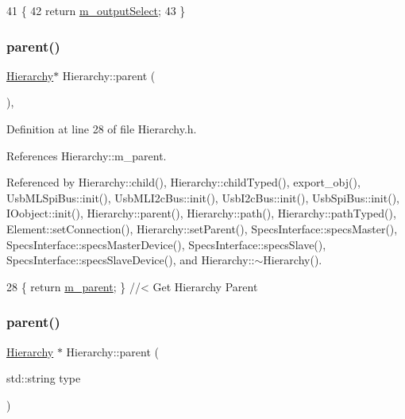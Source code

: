 \begin{DoxyCode}
41                                            \{
42     \textcolor{keywordflow}{return} \hyperlink{classSpecsInterface_a660cb4112ce1c071f277cb6ec115b411}{m\_outputSelect};
43 \}
\end{DoxyCode}
\mbox{\label{classHierarchy_a1c7bec8257e717f9c1465e06ebf845fc}} 
\subsubsection{\texorpdfstring{parent()}{parent()}\hspace{0.1cm}{\footnotesize\ttfamily [1/2]}}
{\footnotesize\ttfamily \hyperlink{classHierarchy}{Hierarchy}$\ast$ Hierarchy\+::parent (\begin{DoxyParamCaption}{ }\end{DoxyParamCaption})\hspace{0.3cm}{\ttfamily [inline]}, {\ttfamily [inherited]}}



Definition at line 28 of file Hierarchy.\+h.



References Hierarchy\+::m\+\_\+parent.



Referenced by Hierarchy\+::child(), Hierarchy\+::child\+Typed(), export\+\_\+obj(), Usb\+M\+L\+Spi\+Bus\+::init(), Usb\+M\+L\+I2c\+Bus\+::init(), Usb\+I2c\+Bus\+::init(), Usb\+Spi\+Bus\+::init(), I\+Oobject\+::init(), Hierarchy\+::parent(), Hierarchy\+::path(), Hierarchy\+::path\+Typed(), Element\+::set\+Connection(), Hierarchy\+::set\+Parent(), Specs\+Interface\+::specs\+Master(), Specs\+Interface\+::specs\+Master\+Device(), Specs\+Interface\+::specs\+Slave(), Specs\+Interface\+::specs\+Slave\+Device(), and Hierarchy\+::$\sim$\+Hierarchy().


\begin{DoxyCode}
28 \{ \textcolor{keywordflow}{return} \hyperlink{classHierarchy_a5814bb280d4e8539ab25ab6cbfb9cc4f}{m\_parent}; \}  \textcolor{comment}{//< Get Hierarchy Parent}
\end{DoxyCode}
\mbox{\label{classHierarchy_ad550588733bf75ac5c0fcfd7c8fd11a6}} 
\subsubsection{\texorpdfstring{parent()}{parent()}\hspace{0.1cm}{\footnotesize\ttfamily [2/2]}}
{\footnotesize\ttfamily \hyperlink{classHierarchy}{Hierarchy} $\ast$ Hierarchy\+::parent (\begin{DoxyParamCaption}\item[{std\+::string}]{type }\end{DoxyParamCaption})\hspace{0.3cm}{\ttfamily [inherited]}}



